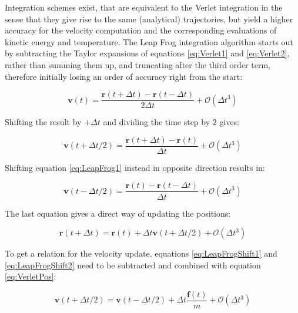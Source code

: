 \documentclass[english, a4paper, 12pt, titlepage, draft]{article}
\newcommand{\vect}[1]{\mathbf{#1}}
\newcommand{\vfun}[2]{\vect{#1}\left(#2\right)}
\begin{document}
Integration schemes exist, that are equivalent to the Verlet integration in the sense that they give rise to the same (analytical) trajectories, but yield a higher accuracy for the velocity computation and the corresponding evaluations of kinetic energy and temperature.
The Leap Frog integration algorithm starts out by subtracting the Taylor expansions of equations \ref{eq:Verlet1} and \ref{eq:Verlet2}, rather than summing them up, and truncating after the third order term, therefore initially losing an order of accuracy right from the start:

\begin{equation}
    \vfun{v}{t} = \frac{\vfun{r}{t+\Delta t} - \vfun{r}{t-\Delta t}}{2 \Delta t} + \mathcal{O}(\Delta t^3)
    \label{eq:LeapFrog1}
\end{equation}

Shifting the result by $+\Delta t$ and dividing the time step by $2$ gives:

\begin{equation}
    \vfun{v}{t + \Delta t/2} = \frac{\vfun{r}{t+\Delta t} - \vfun{r}{t}}{\Delta t} + \mathcal{O}(\Delta t^3)
    \label{eq:LeapFrogShift1}
\end{equation}

Shifting equation \ref{eq:LeapFrog1} instead in opposite direction results in:

\begin{equation}
    \vfun{v}{t - \Delta t/2} = \frac{\vfun{r}{t} - \vfun{r}{t-\Delta t}}{\Delta t} + \mathcal{O}(\Delta t^3)
    \label{eq:LeapFrogShift2}
\end{equation} 

The last equation gives a direct way of updating the positions:

\begin{equation}
    \vfun{r}{t+\Delta t} = \vfun{r}{t} + \Delta t \vfun{v}{t+\Delta t/2} + \mathcal{O}(\Delta t^3)
\end{equation}

To get a relation for the velocity update, equations \ref{eq:LeapFrogShift1} and \ref{eq:LeapFrogShift2} need to be subtracted and combined with equation \ref{eq:VerletPos}:

\begin{equation}
    \vfun{v}{t+\Delta t/2} = \vfun{v}{t-\Delta t/2} + \Delta t \frac{\vfun{f}{t}}{m} + \mathcal{O}(\Delta t^3)
\end{equation}
\end{document}
